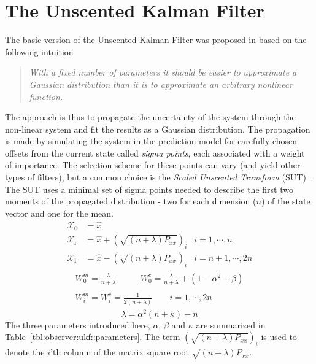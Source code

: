 \section{The Unscented Kalman Filter}
\label{sec:observer:ukf}
    The basic version of the Unscented Kalman Filter was proposed in \citep{Julier95anewapproach}
    based on the following intuition \citep{Julier95anewapproach}
    \begin{quote}\textit{
        With a fixed number of parameters it should be easier to approximate a Gaussian
        distribution than it is to approximate an arbitrary nonlinear function.
        }
    \end{quote}
    The approach is thus to propagate the uncertainty of the system
    through the non-linear system and fit the results as a Gaussian distribution.
    The propagation is made by simulating the system in the prediction
    model for carefully chosen offsets from the current state called
    \textit{sigma points}, each associated with a weight of importance.
    The selection scheme for these points can vary (and yield other
    types of filters), but a common choice
    is the \textit{Scaled Unscented Transform} (SUT) \citep{vandermerwe:upf}.
    The SUT uses a minimal set of sigma points needed to describe the
    first two moments of the propagated distribution - two for each
    dimension ($n$) of the state vector and one for the mean.
    \begin{align}\nonumber
        \mathbf{\mathcal{X}_{0}} &= \hat{x} & \\\nonumber
        \mathbf{\mathcal{X}_{i}} &= \hat{x} + \left( \sqrt{(n + \lambda) P_{xx}} \right)_{i}
            & i = 1,\cdots,n \\
        \mathbf{\mathcal{X}_{i}} &= \hat{x} - \left( \sqrt{(n + \lambda) P_{xx}} \right)_{i}
            & i = n+1,\cdots,2n
    \end{align}
    \begin{align}\nonumber
        \begin{array}{lr}
        W_{0}^{m} = \frac{\lambda}{n + \lambda} \qquad&
            W_{0}^{c} = \frac{\lambda}{n + \lambda} + (1-\alpha^{2} + \beta){}
        \end{array}\\
        \begin{array}{c}
            W^{m}_{i} =  W^{c}_{i} = \frac{1}{2(n + \lambda)} \qquad i = 1,\cdots,2n{}
        \end{array}
    \end{align}
    \begin{equation}
        \lambda = \alpha^{2}(n + \kappa) - n
    \end{equation}
    The three parameters introduced here, $\alpha$, $\beta$ and $\kappa$
    are summarized in Table~\ref{tbl:observer:ukf::parameters}.
    The term $\left( \sqrt{(n + \lambda) P_{xx}} \right)_{i}$ is used to
    denote the $i$'th column of the matrix square root $\sqrt{(n + \lambda) P_{xx}}$.



